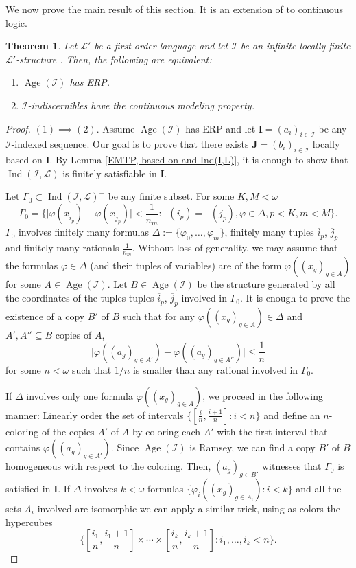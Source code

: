 \documentclass{amsart}
\newtheorem{teor}{Theorem}[section]
\newtheorem{external claim}[teor]{Claim}
\newcommand{\mL}{\mathcal{L}}
\newcommand{\I}{\mathcal{I}}
\newcommand{\II}{\mathbf{I}}
\DeclareMathOperator{\qftp}{{tp^{qf}}}
\DeclareMathOperator{\age}{{Age}}
\DeclareMathOperator{\Ind}{{Ind}}
\begin{document}
We now prove the main result of this section. It is an extension of \cite[Theorem 2.10]{SCOW2021102891} to continuous logic. 

\begin{teor}\label{CMP iff Ramsey} Let $\mL'$ be a first-order language %
and let $\I$ be an infinite locally finite $\mL'$-structure%
. Then, the following are equivalent:
\begin{enumerate}
    \item $\age(\I)$ has ERP.
    \item $\I$-indiscernibles have the continuous modeling property.
\end{enumerate}
\end{teor}
\begin{proof} 
    $(1)\implies (2)$. Assume $\age(\I)$ has ERP and let $\II= (a_i)_{i\in \I}$ be any $\I$-indexed sequence. Our goal is to prove that there exists $\mathbf{J}=(b_i)_{i\in \I}$ locally based on $\II$. By Lemma \ref{EMTP, based on and Ind(I,L)}, it is enough to show that $\Ind(\I,\mL)$ is finitely satisfiable in $\II$.

    Let $\Gamma_0\subset \Ind(\I,\mL)^+$ be any finite subset. For some $K,M<\omega$  $$\Gamma_0=\{ \lvert \varphi(x_{\overline{i}_p})-\varphi(x_{\overline{j}_p})\rvert <\frac{1}{n_m}: \qftp(\overline{i}_p)=\qftp(\overline{j}_p), \varphi\in \Delta, p<K,m<M  \}.$$ $\Gamma_0$ involves finitely many formulas $\Delta:=\{ \varphi_0,\dots,\varphi_m\}$, finitely many tuples $\overline{i}_p$, $\overline{j}_p$ and finitely many rationals $\frac{1}{n_m}$. Without loss of generality, we may assume that the formulas  $\varphi\in \Delta$ (and their tuples of variables) are of the form $\varphi((x_g)_{g\in A})$ for some $A\in \age(\I)$. Let $B\in \age(\I)$ be the structure generated by all the %
    coordinates of the tuples tuples $\overline{i}_p$, $\overline{j}_p$ involved in $\Gamma_0$. It is enough to prove the existence of a copy $B'$ of $B$ such that for any $\varphi((x_g)_{g\in A})\in \Delta$ and $A',A''\subseteq B$ copies of $A$,  $$\lvert \varphi((a_g)_{g\in A'}) - \varphi((a_g)_{g\in A''})\rvert \leq \frac{1}{n} $$ for some $n<\omega$ such that $1/n$ is smaller than any rational involved in $\Gamma_0$.


    If $\Delta$ involves only one formula $\varphi((x_g)_{g\in A})$, we proceed in the following manner: Linearly order the set of intervals $\{ [\frac{i}{n},\frac{i+1}{n}]: i<n \}$ and define an $n$-coloring of the copies $A'$ of $A$ by coloring each $A'$ with the first interval that contains $\varphi((a_g)_{g\in A'})$. Since $\age(\I)$ is Ramsey, we can find a copy $B'$ of $B$ homogeneous with respect to the coloring.
    Then, $(a_g)_{g\in B'}$ witnesses that $\Gamma_0$ is satisfied in $\II$. If $\Delta$ involves $k<\omega$ formulas $ \{ \varphi_i((x_g)_{g\in A_i}) : i<k\}$ and all the sets $A_i$ involved are isomorphic we can apply a similar trick, using as colors the hypercubes $$\{ [\frac{i_1}{n}, \frac{i_1+1}{n}]\times\cdots\times [\frac{i_k}{n}, \frac{i_k+1}{n}]: i_1,\dots,i_k<n \}.$$ 


\end{proof}
\end{document}
